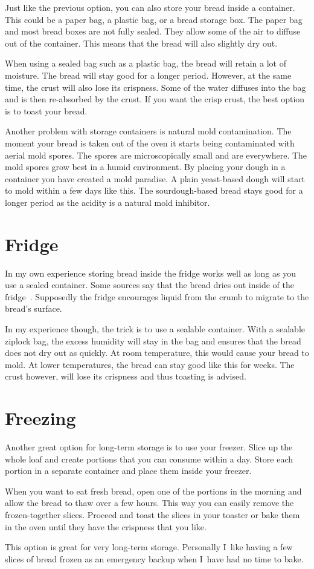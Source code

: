 Just like the previous option, you can also store your
bread inside a container. This could be a paper bag,
a plastic bag, or a bread storage box. The paper bag and
most bread boxes are not fully sealed. They allow some of
the air to diffuse out of the container. This means that
the bread will also slightly dry out.

When using a sealed bag such as a plastic bag, the bread
will retain a lot of moisture. The bread will stay good
for a longer period. However, at the same time, the crust
will also lose its crispness. Some of the water diffuses
into the bag and is then re-absorbed by the crust. If
you want the crisp crust, the best option is to toast your
bread.

Another problem with storage containers is natural
mold contamination. The moment your bread is taken out of
the oven it starts being contaminated with aerial mold spores.
The spores are microscopically small and are everywhere.
The mold spores grow best in a humid environment. By placing
your dough in a container you have created a mold paradise.
A plain yeast-based dough will start to mold within a few days
like this. The sourdough-based bread stays good
for a longer period as the acidity is a natural mold
inhibitor.

\section{Fridge}

In my own experience storing bread inside the fridge
works well as long as you use a sealed container. Some
sources say that the bread dries out inside of the
fridge~\cite{storing+bread}. Supposedly the fridge
encourages liquid from the crumb to migrate to the bread's surface.

In my experience though, the trick is to use a sealable
container. With a sealable ziplock bag,
the excess humidity will stay in the bag and ensures
that the bread does not dry out as quickly. At room
temperature, this would cause your bread to mold. At
lower temperatures, the bread can stay good like this for
weeks. The crust however, will lose its crispness and
thus toasting is advised.

\section{Freezing}

Another great option for long-term storage is to use
your freezer. Slice up the whole loaf and create portions
that you can consume within a day. Store each portion
in a separate container and place them inside your
freezer.

When you want to eat fresh bread, open one of the portions
in the morning and allow the bread to thaw over a few
hours. This way you can easily remove the frozen-together
slices. Proceed and toast the slices in your toaster
or bake them in the oven until they have the crispness
that you like.

This option is great for very long-term storage. Personally
I~like having a few slices of bread frozen as an emergency
backup when I~have had no time to bake.
